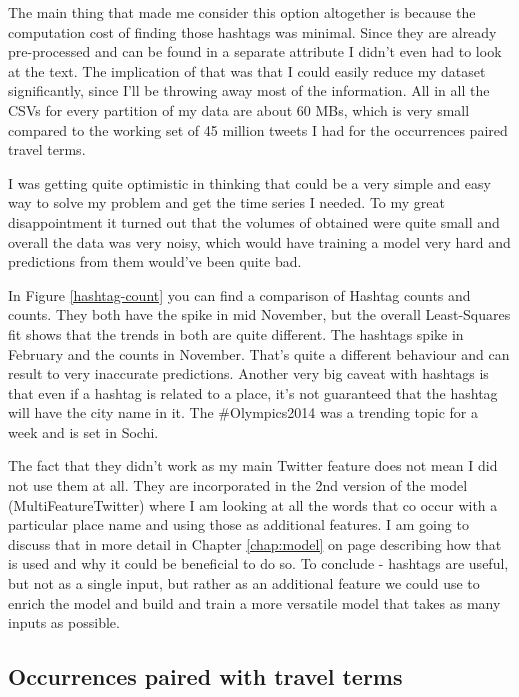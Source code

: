 \documentclass[minf,twoside,singlespacing,parskip,frontabs]{infthesis}
\begin{document}
The main thing that made me consider this option altogether is because the computation cost of finding those hashtags was minimal. Since they are already pre-processed and can be found in a separate attribute I didn't even had to look at the text. The implication of that was that I could easily reduce my dataset significantly, since I'll be throwing away most of the information. All in all the CSVs for every partition of my data are about 60 MBs, which is very small compared to the working set of 45 million tweets I had for the occurrences paired travel terms. 


I was getting quite optimistic  in thinking that could be a very simple and easy way to solve my problem and get the time series I needed. To my great disappointment it turned out that the volumes of obtained were quite small and overall the data was very noisy, which would have training a model very hard and predictions from them would've been quite bad. 


In Figure \ref{hashtag-count} you can find a comparison of Hashtag counts and counts. They both have the spike in mid November, but the overall Least-Squares fit shows that the trends in both are quite different. The hashtags spike in February and the counts in November. That's quite a different behaviour and can result to very inaccurate predictions. Another very big caveat with hashtags is that even if a hashtag is related to a place, it's not guaranteed that the hashtag will have the city name in it. The \#Olympics2014 was a trending topic for a week and is set in Sochi. 


The fact that they didn't work as my main Twitter feature does not mean I did not use them at all. They are incorporated in the 2nd version of the model (MultiFeatureTwitter) where I am looking at all the words that co occur with a particular place name and using those as additional features. I am going to discuss that in more detail in Chapter \ref{chap:model} on page \pageref{chap:model} describing how that is used and why it could be beneficial to do so. To conclude - hashtags are useful, but not as a single input, but rather as an additional feature we could use to enrich the model and build and train a more versatile model that takes as many inputs as possible. 



\subsection{Occurrences paired with travel terms} 
\label{sec:tweettext}
\end{document}
